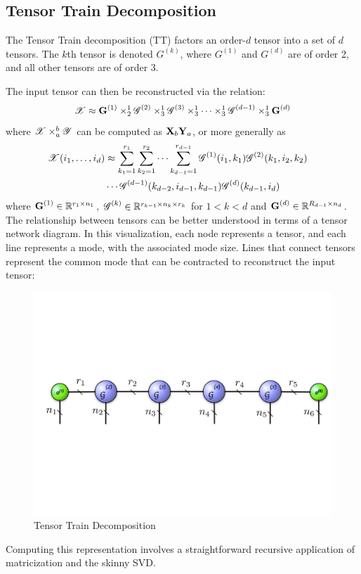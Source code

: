 \subsection{Tensor Train Decomposition}
The Tensor Train decomposition (TT) factors an order-$d$ tensor into a set of $d$ tensors. The $k$th tensor is denoted $G^{(k)}$, where $G^{(1)}$ and $G^{(d)}$ are of order 2, and all other tensors are of order 3. 

The input tensor can then be reconstructed via the relation:
\begin{equation}
\T{X} \approx \M{G}^{(1)} \times_{2}^1 \T{G}^{(2)} \times_{3}^1 \T{G}^{(3)} \times_3^1 \dots
\times_3^1 \T{G}^{(d-1)}\times_3^1 \M{G}^{(d)} 
\end{equation}
where $\T{X} \times_a^b \T{Y}$ can be computed as $\M{X}_b \M{Y}_a$, or more generally as 
\begin{align*}
\T{X}(i_1,\dots,i_d) & \approx  
\sum_{{k_1}=1}^{r_1} \sum_{{k_2}=1}^{r_2}\cdots\sum_{{k_{d-1}}=1}^{r_{d-1}} \T{G}^{(1)}(i_1,k_1)\T{G}^{(2)}(k_1,i_2,k_2) & \\ & \cdots\T{G}^{(d-1)}(k_{d-2},i_{d-1},k_{d-1})\T{G}^{(d)}(k_{d-1},i_d)
\end{align*}
where $\M{G}^{(1)}\in \R^{r_1\times n_1}$, $\T{G}^{(k)} \in \R^{r_{k-1}\times n_k \times r_k}$ for $1< k< d$ and $\M{G}^{(d)}\in \R^{R_{d-1}\times n_d}$. The relationship between tensors can be better understood in terms of a tensor network diagram. In this visualization, each node represents a tensor, and each line represents a mode, with the associated mode size. Lines that connect tensors represent the common mode that can be contracted to reconstruct the input tensor:
\begin{figure}[htbp]
    \center\includegraphics[width=0.80\linewidth]{thpropfigs/tensortrain}
    \caption{Tensor Train Decomposition}
\end{figure}
Computing this representation involves a straightforward recursive application of matricization and the skinny SVD.
